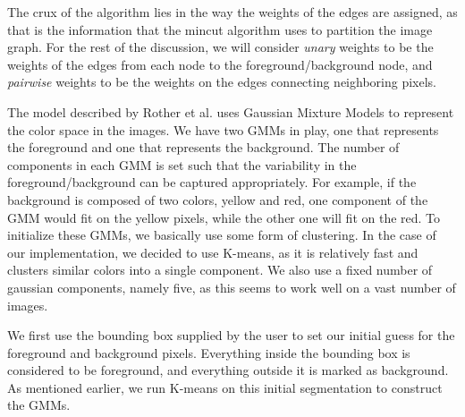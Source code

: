 \documentclass[10pt,twocolumn,letterpaper]{article}
\begin{document}
The crux of the algorithm lies in the way the weights of the edges are assigned, as that is the information that the mincut algorithm uses to partition the image graph. For the rest of the discussion, we will consider \emph{unary} weights to be the weights of the edges from each node to the foreground/background node, and \emph{pairwise} weights to be the weights on the edges connecting neighboring pixels. 

The model described by Rother et al. uses Gaussian Mixture Models to represent the color space in the images. We have two GMMs in play, one that represents the foreground and one that represents the background. The number of components in each GMM is set such that the variability in the foreground/background can be captured appropriately. For example, if the background is composed of two colors, yellow and red, one component of the GMM would fit on the yellow pixels, while the other one will fit on the red. To initialize these GMMs, we basically use some form of clustering. In the case of our implementation, we decided to use K-means, as it is relatively fast and clusters similar colors into a single component. We also use a fixed number of gaussian components, namely five, as this seems to work well on a vast number of images.

We first use the bounding box supplied by the user to set our initial guess for the foreground and background pixels. Everything inside the bounding box is considered to be foreground, and everything outside it is marked as background. As mentioned earlier, we run K-means on this initial segmentation to construct the GMMs.
\end{document}

